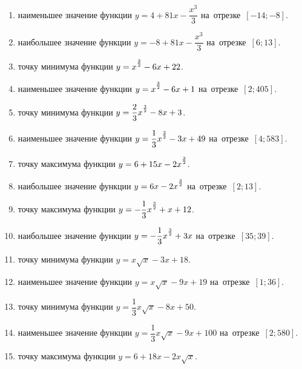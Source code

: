 \documentclass[a4paper,10pt]{article}
\begin{document}
\begin{enumerate}
\item {} наименьшее значение функции $y=4 +81x-\dfrac{x^3}{3}$ на~отрезке~$\left[-14;-8\right]$.

\item {} наибольшее значение функции $y=-8 +81x-\dfrac{x^3}{3}$ на~отрезке~$\left[6;13\right]$.

\item {} точку минимума функции $y=x\strut^{\frac{3}{2}} -6x+22$.

\item {} наименьшее значение функции $y=x\strut^{\frac{3}{2}} -6x+1$ на~отрезке~$\left[2;405\right]$.

\item {} точку минимума функции $y=\dfrac{2}{3}x\strut^{\frac{3}{2}} -8x+3$.

\item {} наименьшее значение функции $y=\dfrac{1}{3}x\strut^{\frac{3}{2}} -3x+49$ на~отрезке~$\left[4;583\right]$.

\item {} точку максимума функции $y=6+15x-2x\strut^{\frac{3}{2}}$.

\item {} наибольшее значение функции $y=6x-2x\strut^{\frac{3}{2}}$ на~отрезке~$\left[2;13\right]$.

\item {} точку максимума функции $y=-\dfrac{1}{3}x\strut^{\frac{3}{2}} +x+12$.

\item {} наибольшее значение функции $y=-\dfrac{1}{3}x\strut^{\frac{3}{2}} +3x$ на~отрезке~$\left[35;39\right]$.

\item {} точку минимума функции $y=x\sqrt{x} -3x+18$.

\item {} наименьшее значение функции $y=x\sqrt{x} -9x+19$ на~отрезке~$\left[1;36\right]$.

\item {} точку минимума функции $y=\dfrac{1}{3}x\sqrt{x} -8x+50$.

\item {} наименьшее значение функции $y=\dfrac{1}{3}x\sqrt{x} -9x+100$ на~отрезке~$\left[2;580\right]$.

\item {} точку максимума функции $y=6+18x -2x\sqrt{x}$.


\end{enumerate}
\end{document}
